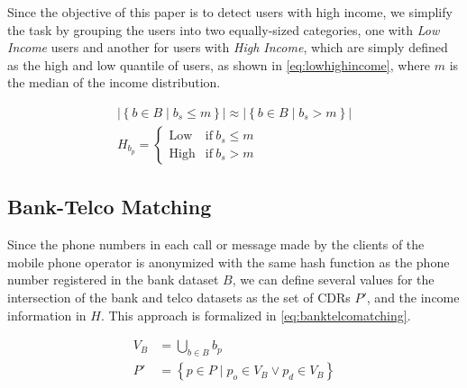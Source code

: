 Since the objective of this paper is to detect users with high income, we simplify the task by %
grouping the users into two equally-sized categories, one with \emph{Low Income} users and another for users with \emph{High Income}, which are simply defined as the high and low quantile of users, as shown in \cref{eq:lowhighincome},
where $m$ is the median of the income distribution.

\begin{equation}
\label{eq:lowhighincome}
\begin{gathered}
	\left| \left\{ b \in B \mid b_s \leq m \right\} \right| \approx \left| \left\{ b \in B \mid b_s > m \right\} \right| \\
	H_{b_p} = \begin{cases} \text{Low} & \text{if} \ b_s \leq m \\ \text{High} & \text{if} \ b_s > m \end{cases}
\end{gathered}
\end{equation}

\subsection{Bank-Telco Matching}

Since the phone numbers in each call or message made by the clients of the mobile phone operator is anonymized with the same hash function as the phone number registered in the bank dataset $B$, we can define several values for the intersection of the bank and telco datasets as the set of CDRs $P'$, and the income information in $H$. This approach is formalized in \cref{eq:banktelcomatching}.

\begin{equation}
\label{eq:banktelcomatching}
\begin{aligned}
	V_B &= \bigcup_{b \in B} b_p \\
	P' &= \left\{ p \in P \mid p_o \in V_B \lor p_d \in V_B \right\}
\end{aligned}
\end{equation}

